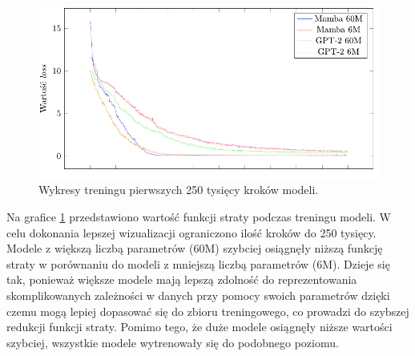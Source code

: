 \documentclass[data-science]{agh-wi} %
\begin{document}
\begin{figure}[ht!]
    \centering
    \includegraphics[width=0.9\linewidth]{./img/training_plot.pdf}
    \caption{Wykresy treningu pierwszych 250 tysięcy kroków modeli.}\label{fig:midi_train}
\end{figure}

Na grafice \ref*{fig:midi_train} przedstawiono wartość funkcji straty podczas treningu modeli. W celu dokonania lepszej wizualizacji ograniczono ilość kroków do 250 tysięcy. Modele z większą liczbą parametrów (60M) szybciej osiągnęły niższą funkcję straty w porównaniu do modeli z mniejszą liczbą parametrów (6M). Dzieje się tak, ponieważ większe modele mają lepszą zdolność do reprezentowania skomplikowanych zależności w danych przy pomocy swoich parametrów dzięki czemu mogą lepiej dopasować się do zbioru treningowego, co prowadzi do szybszej redukcji funkcji straty. Pomimo tego, że duże modele osiągnęły niższe wartości szybciej, wszystkie modele wytrenowały się do podobnego poziomu.
\end{document}

